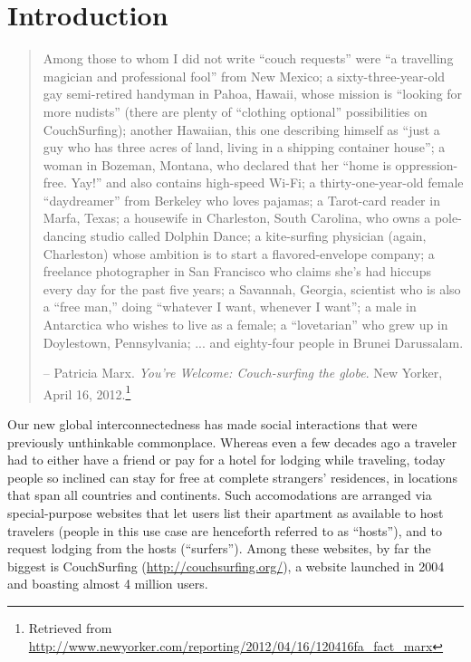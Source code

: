 \section{Introduction}

\begin{quotation}
Among those to whom I did not write “couch requests” were “a travelling magician and professional fool” from New Mexico; a sixty-three-year-old gay semi-retired handyman in Pahoa, Hawaii, whose mission is “looking for more nudists” (there are plenty of “clothing optional” possibilities on CouchSurfing); another Hawaiian, this one describing himself as “just a guy who has three acres of land, living in a shipping container house”; a woman in Bozeman, Montana, who declared that her “home is oppression-free. Yay!” and also contains high-speed Wi-Fi; a thirty-one-year-old female “daydreamer” from Berkeley who loves pajamas; a Tarot-card reader in Marfa, Texas; a housewife in Charleston, South Carolina, who owns a pole-dancing studio called Dolphin Dance; a kite-surfing physician (again, Charleston) whose ambition is to start a flavored-envelope company; a freelance photographer in San Francisco who claims she’s had hiccups every day for the past five years; a Savannah, Georgia, scientist who is also a “free man,” doing “whatever I want, whenever I want”; a male in Antarctica who wishes to live as a female; a “lovetarian” who grew up in Doylestown, Pennsylvania; ... and eighty-four people in Brunei Darussalam.

-- Patricia Marx. \emph{You're Welcome: Couch-surfing the globe}. New Yorker, April 16, 2012.\footnote{Retrieved from \url{http://www.newyorker.com/reporting/2012/04/16/120416fa_fact_marx}}
\end{quotation}

Our new global interconnectedness has made social interactions that were previously unthinkable commonplace.
Whereas even a few decades ago a traveler had to either have a friend or pay for a hotel for lodging while traveling, today people so inclined can stay for free at complete strangers' residences, in locations that span all countries and continents.
Such accomodations are arranged via special-purpose websites that let users list their apartment as available to host travelers (people in this use case are henceforth referred to as ``hosts''), and to request lodging from the hosts (``surfers'').
Among these websites, by far the biggest is CouchSurfing (\url{http://couchsurfing.org/}), a website launched in 2004 and boasting almost 4 million users.

